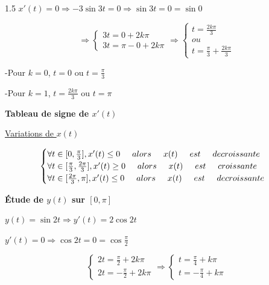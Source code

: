 \documentclass[12pt]{article}
\begin{document}
\begin{spacing}{1.5}
$x'(t)=0\Rightarrow -3\sin 3t=0\Rightarrow \sin 3t=0=\sin 0$

\[
\Rightarrow\begin{cases}
3t=0+2k\pi\\
3t=\pi-0+2k\pi
\end{cases}\Rightarrow \begin{cases}
t=\frac{2k\pi}{3}\\
ou\\
t=\frac{\pi}{3}+\frac{2k\pi}{3}
\end{cases}
\]

-Pour $k=0$, $t=0$ ou $t=\frac{\pi}{3} $

-Pour $k=1$, $t=\frac{2k\pi}{3}$ ou $t=\pi$

\textbf{Tableau de signe de $x'(t)$}


\underline{Variations de $x(t)$}

\[
\begin{cases}
\forall t\in [0,\frac{\pi}{3}],x'(t)\leq 0\hspace*{0.5cm} alors\hspace*{0.5cm} x(t)\hspace*{0.5cm} est \hspace*{0.5cm}decroissante\\
\forall t\in [\frac{\pi}{3}, \frac{2\pi}{3}], x'(t)\geq 0 \hspace*{0.5cm} alors\hspace*{0.5cm} x(t)\hspace*{0.5cm} est\hspace*{0.5cm} croissante\\
\forall t\in [\frac{2\pi}{3},\pi], x'(t)\leq 0\hspace*{0.5cm} alors\hspace*{0.5cm} x(t)\hspace*{0.5cm} est\hspace*{0.5cm} decroissante
\end{cases}
\]

\medskip\textbf{Étude de $y(t)$ sur $[0,\pi]$}

$y(t)=\sin{2t}\Rightarrow y'(t)=2\cos 2t$

$y'(t)=0\Rightarrow \cos 2t=0=\cos\frac{\pi}{2}$

\[
\begin{cases}
2t=\frac{\pi}{2}+2k\pi\\
2t=-\frac{\pi}{2}+2k\pi
\end{cases}\Rightarrow
\begin{cases}
t=\frac{\pi}{4}+k\pi\\
t=-\frac{\pi}{4}+k\pi
\end{cases}
\]


\end{spacing}
\end{document}
